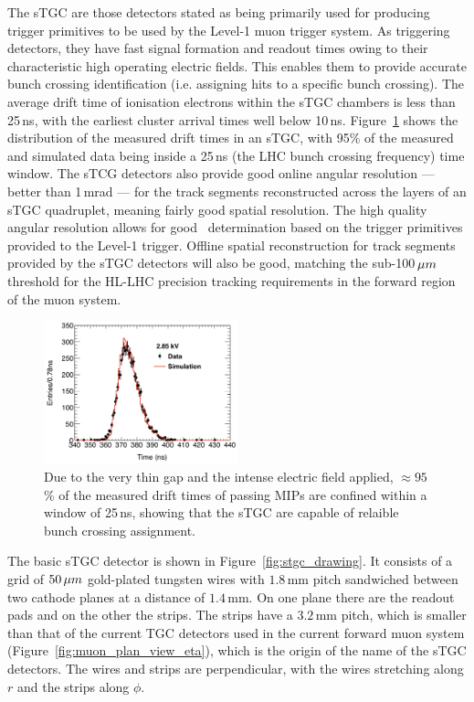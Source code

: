 The sTGC are those detectors stated as being primarily used for producing trigger primitives
to be used by the Level-1 muon trigger system.
As triggering detectors, they have fast signal formation and readout times owing to their characteristic high
operating electric fields.
This enables
them to provide accurate bunch crossing identification (i.e. assigning hits to a specific bunch crossing).
The average drift time of ionisation electrons within the sTGC chambers is less than 25\,ns,
with the earliest cluster arrival times well below 10\,ns.
Figure~\ref{fig:stgc_timing} shows the distribution of the measured drift times in an
sTGC, with 95\% of the measured and simulated data being inside a 25\,ns (the LHC bunch crossing
frequency) time window.
The sTCG detectors also provide good online angular resolution --- better than 1\,mrad --- for the track segments
reconstructed across the layers of an sTGC quadruplet, meaning fairly good spatial resolution.
The high quality angular resolution allows for good \pT~determination based on the trigger primitives
provided to the Level-1 trigger.
Offline spatial reconstruction for track segments provided by the sTGC detectors will also be good, matching
the sub-100$\,\mu m$ threshold for the HL-LHC precision tracking requirements in the forward region
of the muon system.

\begin{figure}[!htb]
    \begin{center}
        \includegraphics[width=0.5\textwidth]{figures/nsw/stgc_timing}
        \caption{
            Due to the very thin gap and the intense electric field applied,
            $\approx95$\,\% of the measured drift times of passing MIPs are
            confined within a window of 25\,ns, showing that the sTGC
            are capable of relaible bunch crossing assignment.
        }
        \label{fig:stgc_timing}
    \end{center}
\end{figure}

The basic sTGC detector is shown in Figure~\ref{fig:stgc_drawing}.
It consists of a grid of $50\,\mu m$ gold-plated tungsten wires with $1.8$\,mm pitch
sandwiched between two cathode planes at a distance of $1.4$\,mm.
On one plane there are the readout pads and on the other the strips.
The strips have a $3.2$\,mm pitch, which is smaller than that of the current TGC
detectors used in the current forward muon system (Figure~\ref{fig:muon_plan_view_eta}),
which is the origin of the name of the sTGC detectors.
The wires and strips are perpendicular, with the wires stretching along $r$ and the
strips along $\phi$.

